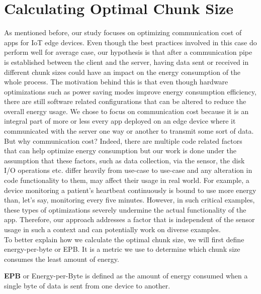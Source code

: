 \section{Calculating Optimal Chunk Size}
As mentioned before, our study focuses on optimizing communication cost of apps for IoT edge devices. 
Even though the best practices involved in this case do perform well for average case, our hypothesis 
is that after a communication pipe is established between the client and the server, having data sent or 
received in different chunk sizes could have an impact on the energy consumption of the whole process. 
The motivation behind this is that even though hardware optimizations such as power saving modes improve 
energy consumption efficiency, there are still software related configurations that can be altered to reduce 
the overall energy usage. We chose to focus on communication cost because it is an integral part of more or less 
every app deployed on an edge device where it communicated with the server one way or another to transmit 
some sort of data. \\
But why communication cost? Indeed, there are multiple code related factors that can help optimize energy 
consumption but our work is done under the assumption that these factors, such as data collection, via the 
sensor, the disk I/O operations etc. differ heavily from use-case to use-case and any alteration in code 
functionality to them, may affect their usage in real world. For example, a device monitoring a patient's 
heartbeat continuously is bound to use more energy than, let's say, monitoring every five minutes. 
However, in such critical examples, these types of optimizations severely undermine the actual 
functionality of the app. Therefore, our approach addresses a factor that is independent of the sensor 
usage in such a context and can potentially work on diverse examples. \\
To better explain how we calculate the optimal chunk size, we will first define energy-per-byte or EPB. 
It is a metric we use to determine which chunk size consumes the least amount of energy. \\

\begin{definition}
    \textbf{EPB} or Energy-per-Byte is defined as the amount of energy consumed when a single byte of data is sent from one device to another.
\end{definition}

